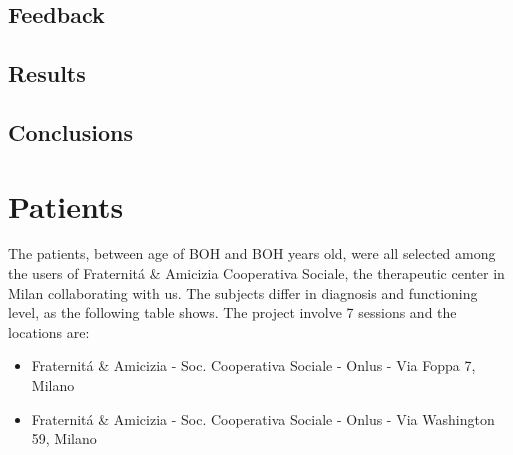 \subsection{Feedback}
\subsection{Results}
\subsection{Conclusions}

\section{Patients}
The patients, between age of BOH and BOH years old, were all selected among the users of Fraternit\'a \& Amicizia Cooperativa Sociale, the therapeutic center in Milan collaborating with us. The subjects differ in diagnosis and functioning level, as the following table shows. The project involve 7 sessions and the locations are:
\begin{itemize}
\item Fraternit\'a \& Amicizia - Soc. Cooperativa Sociale - Onlus - Via Foppa 7, Milano
\item Fraternit\'a \& Amicizia - Soc. Cooperativa Sociale - Onlus - Via Washington 59, Milano
\end{itemize} 
